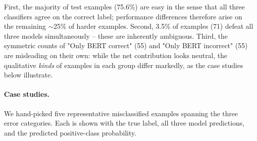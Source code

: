 \documentclass[11pt,a4paper]{article}
\begin{document}
First, the majority of test examples (75.6\%) are easy in the sense that all three classifiers agree on the correct label; performance differences therefore arise on the remaining $\sim$25\% of harder examples. Second, 3.5\% of examples (71) defeat all three models simultaneously -- these are inherently ambiguous. Third, the symmetric counts of "Only BERT correct" (55) and "Only BERT incorrect" (55) are misleading on their own: while the net contribution looks neutral, the qualitative \emph{kinds} of examples in each group differ markedly, as the case studies below illustrate.

\paragraph{Case studies.} We hand-picked five representative misclassified examples spanning the three error categories. Each is shown with the true label, all three model predictions, and the predicted positive-class probability.
\end{document}
